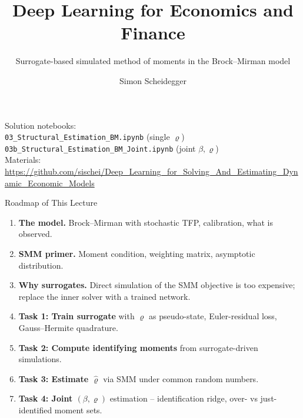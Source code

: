 \documentclass[10pt,aspectratio=169]{beamer}
\title[Deep Learning for Dynamic Economic Models]
{Deep Learning for Economics and Finance}
\subtitle{Surrogate-based simulated method of moments in the Brock--Mirman model}
\author{Simon Scheidegger}
\institute[HEC Lausanne]{HEC, University of Lausanne}
\date{}
\begin{document}
{
\begin{frame}
\titlepage
\vspace{-0.3cm}
\begin{center}
{\footnotesize Solution notebooks:}\\[1pt]
{\footnotesize \texttt{03\_Structural\_Estimation\_BM.ipynb} (single $\varrho$)}\\
{\footnotesize \texttt{03b\_Structural\_Estimation\_BM\_Joint.ipynb} (joint $\beta,\varrho$)}\\[2pt]
{\footnotesize Materials: \url{https://github.com/sischei/Deep_Learning_for_Solving_And_Estimating_Dynamic_Economic_Models}}
\end{center}
\end{frame}
}

\begin{frame}{Roadmap of This Lecture}
\small
\begin{enumerate}
    \item \textbf{The model.} Brock--Mirman with stochastic TFP, calibration, what is observed.
    \vspace{0.2em}
    \item \textbf{SMM primer.} Moment condition, weighting matrix, asymptotic distribution.
    \vspace{0.2em}
    \item \textbf{Why surrogates.} Direct simulation of the SMM objective is too expensive; replace the inner solver with a trained network.
    \vspace{0.2em}
    \item \textbf{Task 1: Train surrogate} with $\varrho$ as pseudo-state, Euler-residual loss, Gauss--Hermite quadrature.
    \vspace{0.2em}
    \item \textbf{Task 2: Compute identifying moments} from surrogate-driven simulations.
    \vspace{0.2em}
    \item \textbf{Task 3: Estimate $\hat\varrho$} via SMM under common random numbers.
    \vspace{0.2em}
    \item \textbf{Task 4: Joint $(\beta, \varrho)$} estimation -- identification ridge, over- vs just-identified moment sets.
\end{enumerate}
\end{frame}
\end{document}
